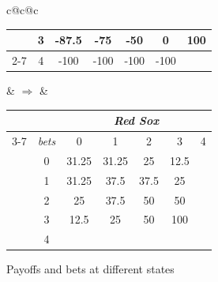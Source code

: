 \begin{figure}[ht]
\begin{tabular}{c@{\qquad}c@{\qquad}c}
\begin{tabular}{|c|c|ccccc|}
& 3 & -87.5 & -75 & -50 & 0 & 100\\ \cline{2-7}
& 4 & -100 & -100 & -100 & -100 & \\
\hline
\end{tabular}
& \(\Longrightarrow\) &
\begin{tabular}{|c|c|ccccc|}
\hline
& & \multicolumn{5}{c|}{\emph{Red Sox}}\\
\cline{3-7}
& \emph{bets} & 0 & 1 & 2 & 3 & 4\\
\hline
\multirow{5}{*}{\rotatebox[origin=c]{90}{Colorado Rockies}}
& 0 & 31.25 & 31.25 & 25 & 12.5 & \\\cline{2-7}
& 1 & 31.25 & 37.5 & 37.5 & 25 & \\\cline{2-7}
& 2 & 25 & 37.5 & 50 & 50 & \\\cline{2-7}
& 3 & 12.5 & 25 & 50 & 100 & \\\cline{2-7}
& 4 &  &  &  &  & \\
\hline
\end{tabular}
\end{tabular}
\caption{Payoffs and bets at different states}
\label{fig:zhou-figure-5-7}
\end{figure}

